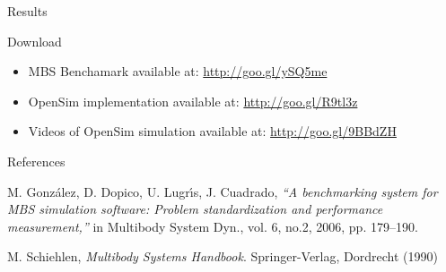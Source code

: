 \documentclass[final]{beamer}
\newlength{\onecolwid}
\begin{document}
\begin{frame}[t]
\begin{columns}[t]
\begin{column}{\onecolwid}
\begin{block}{Results}
\end{block}

\begin{block}{Download}
\begin{itemize}
\item MBS Benchamark available at: \url{http://goo.gl/ySQ5me}
\item OpenSim implementation available at: \url{http://goo.gl/R9tl3z}
\item Videos of OpenSim simulation available at: \url{http://goo.gl/9BBdZH}
\end{itemize}
\end{block}

\begin{block}{References}

\begin{thebibliography}{99}

 M. Gonz{\'a}lez, D. Dopico, U. Lugr{\'\i}s, J. Cuadrado, \textit{``A benchmarking system for MBS simulation software: Problem standardization and performance measurement,''} 	in Multibody System Dyn., vol. 6, no.2,  2006, pp. 179--190.

 M. Schiehlen, \textit{Multibody Systems Handbook}. Springer-Verlag, Dordrecht (1990)

\end{thebibliography}

\end{block}




\end{column} %

\end{columns} %

\end{frame} %
\end{document}
